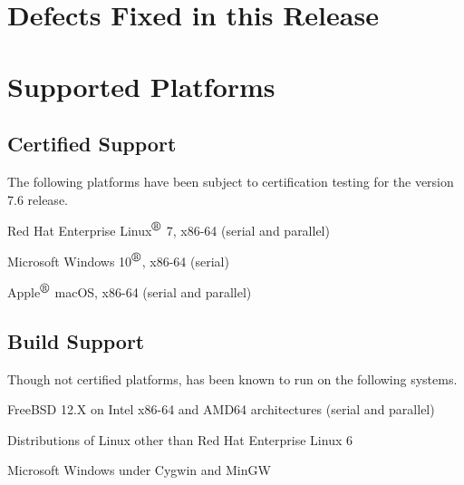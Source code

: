 \documentclass[letterpaper]{scrartcl}
\begin{document}
\newpage
\section{Defects Fixed in this Release}


\newpage
\section{Supported Platforms}
\subsection*{Certified Support}
The following platforms have been subject to certification testing for the
\Xyce{} version 7.6 release.
\begin{XyceItemize}
  \item Red Hat Enterprise Linux${}^{\mbox{\textregistered}}$ 7, x86-64 (serial and parallel)
  \item Microsoft Windows 10${}^{\mbox{\textregistered}}$, x86-64 (serial)
  \item Apple${}^{\mbox{\textregistered}}$ macOS, x86-64 (serial and parallel)
\end{XyceItemize}


\subsection*{Build Support}
Though not certified platforms, \Xyce{} has been known to run on the following
systems.
\begin{XyceItemize}
  \item FreeBSD 12.X on Intel x86-64 and AMD64 architectures (serial
    and parallel)
  \item Distributions of Linux other than Red Hat Enterprise Linux 6
  \item Microsoft Windows under Cygwin and MinGW
\end{XyceItemize}
\end{document}
